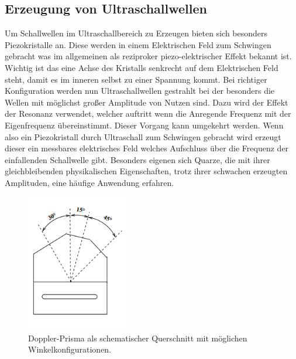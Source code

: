 \subsection{Erzeugung von Ultraschallwellen}
Um Schallwellen im Ultraschallbereich zu Erzeugen bieten sich besonders Piezokristalle an. Diese werden in einem Elektrischen Feld 
zum Schwingen gebracht was im allgemeinen als reziproker piezo-elektrischer Effekt bekannt ist. Wichtig ist das eine Achse des Kristalls
senkrecht auf dem Elektrischen Feld steht, damit es im inneren selbst zu einer Spannung kommt. Bei richtiger Konfiguration werden nun 
Ultraschallwellen gestrahlt bei der besonders die Wellen mit möglichst großer Amplitude von Nutzen sind. 
Dazu wird der Effekt der Resonanz verwendet, welcher auftritt wenn die Anregende Frequenz mit der Eigenfrequenz übereinstimmt.
Dieser Vorgang kann umgekehrt werden. Wenn also ein Piezokristall durch Ultraschall zum Schwingen gebracht wird erzeugt dieser ein messbares
elektrisches Feld welches Aufschluss über die Frequenz der einfallenden Schallwelle gibt. 
Besonders eigenen sich Quarze, die mit ihrer gleichbleibenden physikalischen Eigenschaften, trotz ihrer schwachen erzeugten Amplituden,
eine häufige Anwendung erfahren. 

\begin{figure}
    \centering
    \includegraphics[width=0.4\textwidth]{bilder/winkel2.png}
    \caption{Doppler-Prisma als schematischer Querschnitt mit möglichen Winkelkonfigurationen. \cite{skript}} 
    \label{fig:figskizze1}
\end{figure}